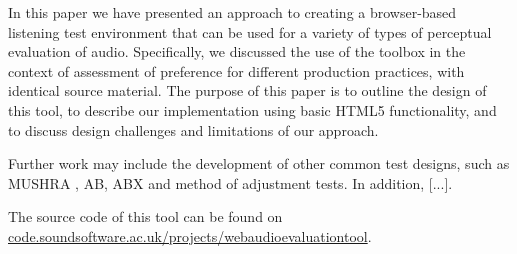 \documentclass{article}
\begin{document}
In this paper we have presented an approach to creating a browser-based listening test environment that can be used for a variety of types of perceptual evaluation of audio. 
Specifically, we discussed the use of the toolbox in the context of assessment of preference for different production practices, with identical source material. 
The purpose of this paper is to outline the design of this tool, to describe our implementation using basic HTML5 functionality, and to discuss design challenges and limitations of our approach. %

Further work may include the development of other common test designs, such as MUSHRA \cite{mushra}, AB, ABX and method of adjustment tests. 
In addition, [...]. 



The source code of this tool can be found on \url{code.soundsoftware.ac.uk/projects/webaudioevaluationtool}. %



\end{document}
